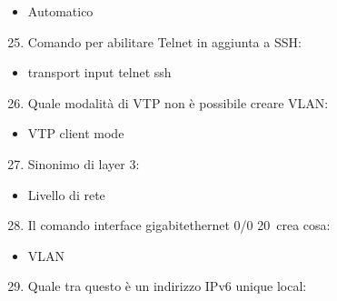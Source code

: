 \documentclass[
]{article}
\providecommand{\tightlist}{%
  \setlength{\itemsep}{0pt}\setlength{\parskip}{0pt}}
\begin{document}
\begin{itemize}
\tightlist
\item
  {Automatico}
\end{itemize}

{}

\begin{enumerate}
\setcounter{enumi}{24}
\tightlist
\item
  {Comando per abilitare Telnet in aggiunta a SSH:}
\end{enumerate}

\begin{itemize}
\tightlist
\item
  {transport input telnet ssh}
\end{itemize}

{}

\begin{enumerate}
\setcounter{enumi}{25}
\tightlist
\item
  {Quale modalità di VTP non è possibile creare VLAN:}
\end{enumerate}

\begin{itemize}
\tightlist
\item
  {VTP client mode}
\end{itemize}

{}

\begin{enumerate}
\setcounter{enumi}{26}
\tightlist
\item
  {Sinonimo di layer 3:}
\end{enumerate}

\begin{itemize}
\tightlist
\item
  {Livello di rete}
\end{itemize}

{}

\begin{enumerate}
\setcounter{enumi}{27}
\tightlist
\item
  {Il comando }{interface gigabitethernet 0/0 20}{~crea cosa:}
\end{enumerate}

\begin{itemize}
\tightlist
\item
  {VLAN}
\end{itemize}

{}

\begin{enumerate}
\setcounter{enumi}{28}
\tightlist
\item
  {Quale tra questo è un indirizzo IPv6 unique local:}
\end{enumerate}
\end{document}
